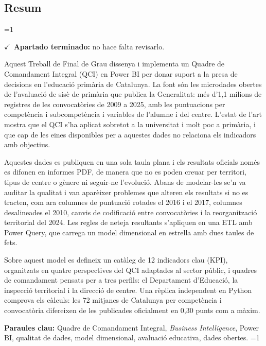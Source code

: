 \documentclass[12pt, a4paper, oneside]{report}
\newcommand{\mostrarterminados}{1}
\newenvironment{revisado}
  {\ifnum\mostrarterminados=1\relax\begin{cajarevisada}\noindent\colorbox{verdeterminado}{\parbox{\dimexpr\linewidth-2\fboxsep\relax}{\small$\checkmark$\ \textbf{Apartado terminado:} no hace falta revisarlo.}}\par\medskip\fi}
  {\ifnum\mostrarterminados=1\relax\end{cajarevisada}\fi}
\begin{document}
\begin{otherlanguage}{catalan}
\chapter*{Resum}
\begin{revisado}
Aquest Treball de Final de Grau dissenya i implementa un Quadre de Comandament Integral (QCI) en Power BI per donar suport a la presa de decisions en l'educació primària de Catalunya. La font són les microdades obertes de l'avaluació de sisè de primària que publica la Generalitat: més d'1,1 milions de registres de les convocatòries de 2009 a 2025, amb les puntuacions per competència i subcompetència i variables de l'alumne i del centre. L'estat de l'art mostra que el QCI s'ha aplicat sobretot a la universitat i molt poc a primària, i que cap de les eines disponibles per a aquestes dades no relaciona els indicadors amb objectius.

Aquestes dades es publiquen en una sola taula plana i els resultats oficials només es difonen en informes PDF, de manera que no es poden creuar per territori, tipus de centre o gènere ni seguir-ne l'evolució. Abans de modelar-les se'n va auditar la qualitat i van aparèixer problemes que alteren els resultats si no es tracten, com ara columnes de puntuació rotades el 2016 i el 2017, columnes desalineades el 2010, canvis de codificació entre convocatòries i la reorganització territorial del 2024. Les regles de neteja resultants s'apliquen en una ETL amb Power Query, que carrega un model dimensional en estrella amb dues taules de fets.

Sobre aquest model es defineix un catàleg de 12 indicadors clau (KPI), organitzats en quatre perspectives del QCI adaptades al sector públic, i quadres de comandament pensats per a tres perfils: el Departament d'Educació, la inspecció territorial i la direcció de centre. Una rèplica independent en Python comprova els càlculs: les 72 mitjanes de Catalunya per competència i convocatòria difereixen de les publicades oficialment en 0,30 punts com a màxim.

\vspace{0.5cm}
\noindent\textbf{Paraules clau:} Quadre de Comandament Integral, \textit{Business Intelligence}, Power BI, qualitat de dades, model dimensional, avaluació educativa, dades obertes.
\end{revisado}
\end{otherlanguage}
\end{document}
